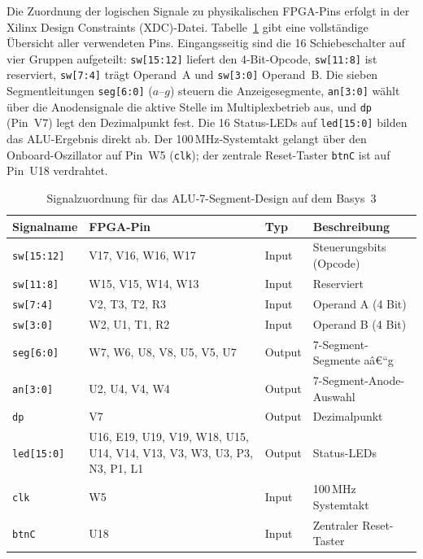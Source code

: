 ﻿\documentclass[12pt,a4paper]{report}
\begin{document}
Die Zuordnung der logischen Signale zu physikalischen FPGA-Pins erfolgt in der Xilinx Design Constraints (XDC)-Datei. Tabelle~\ref{tab:pin_assignment} gibt eine vollständige Übersicht aller verwendeten Pins.
Eingangsseitig sind die 16 Schiebeschalter auf vier Gruppen aufgeteilt: \texttt{sw[15:12]} liefert den 4-Bit-Opcode, \texttt{sw[11:8]} ist reserviert, \texttt{sw[7:4]} trägt Operand~A und \texttt{sw[3:0]} Operand~B. Die sieben Segmentleitungen \texttt{seg[6:0]} ($a$--$g$) steuern die Anzeigesegmente, \texttt{an[3:0]} wählt über die Anodensignale die aktive Stelle im Multiplexbetrieb aus, und \texttt{dp} (Pin~V7) legt den Dezimalpunkt fest. Die 16 Status-LEDs auf \texttt{led[15:0]} bilden das ALU-Ergebnis direkt ab. Der 100\,MHz-Systemtakt gelangt über den Onboard-Oszillator auf Pin~W5 (\texttt{clk}); der zentrale Reset-Taster \texttt{btnC} ist auf Pin~U18 verdrahtet.

\begin{table}
\centering
\begin{tabular}{|l|l|l|l|}
\hline
\textbf{Signalname} & \textbf{FPGA-Pin} & \textbf{Typ} & \textbf{Beschreibung} \\
\hline
\texttt{sw[15:12]} & V17, V16, W16, W17 & Input & Steuerungsbits (Opcode) \\
\texttt{sw[11:8]}  & W15, V15, W14, W13 & Input & Reserviert \\
\texttt{sw[7:4]}   & V2, T3, T2, R3     & Input & Operand A (4 Bit) \\
\texttt{sw[3:0]}   & W2, U1, T1, R2     & Input & Operand B (4 Bit) \\
\texttt{seg[6:0]}  & W7, W6, U8, V8, U5, V5, U7 & Output & 7-Segment-Segmente aâ€“g \\
\texttt{an[3:0]}   & U2, U4, V4, W4     & Output & 7-Segment-Anode-Auswahl \\
\texttt{dp}        & V7                  & Output & Dezimalpunkt \\
\texttt{led[15:0]} & U16, E19, U19, V19, W18, U15, U14, V14, V13, V3, W3, U3, P3, N3, P1, L1 & Output & Status-LEDs \\
\texttt{clk}       & W5                  & Input & 100\,MHz Systemtakt \\
\texttt{btnC}      & U18                 & Input & Zentraler Reset-Taster \\
\hline
\end{tabular}
\caption{Signalzuordnung für das ALU-7-Segment-Design auf dem Basys~3}
\label{tab:pin_assignment}
\end{table}
\end{document}
